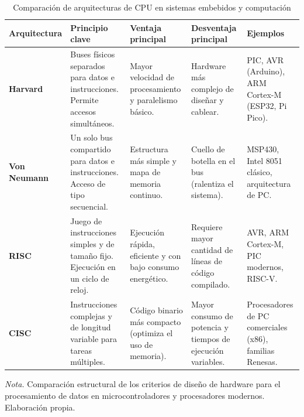 \begin{table}[htbp]
	\centering
	\captionsetup{labelformat=simple, labelsep=newline, textfont=it, labelfont=bf}
	\caption{Comparación de arquitecturas de CPU en sistemas embebidos y computación}
	\label{tab:arqui}
	\vspace{0.3cm}
	
	\begin{tabularx}{\linewidth}{p{2.2cm} X X X p{2.8cm}}
		\toprule %
		\rowcolor[rgb]{0.851, 0.851, 0.851}
		\textbf{Arquitectura} & \textbf{Principio clave} & \textbf{Ventaja principal} & \textbf{Desventaja principal} & \textbf{Ejemplos} \\
		\midrule %
		\textbf{Harvard} & Buses físicos separados para datos e instrucciones. Permite accesos simultáneos. & Mayor velocidad de procesamiento y paralelismo básico. & Hardware más complejo de diseñar y cablear. & PIC, AVR (Arduino), ARM Cortex-M (ESP32, Pi Pico). \\
		\addlinespace
		\textbf{Von Neumann} & Un solo bus compartido para datos e instrucciones. Acceso de tipo secuencial. & Estructura más simple y mapa de memoria continuo. & Cuello de botella en el bus (ralentiza el sistema). & MSP430, Intel 8051 clásico, arquitectura de PC. \\
		\addlinespace
		\textbf{RISC} & Juego de instrucciones simples y de tamaño fijo. Ejecución en un ciclo de reloj. & Ejecución rápida, eficiente y con bajo consumo energético. & Requiere mayor cantidad de líneas de código compilado. & AVR, ARM Cortex-M, PIC modernos, RISC-V. \\
		\addlinespace
		\textbf{CISC} & Instrucciones complejas y de longitud variable para tareas múltiples. & Código binario más compacto (optimiza el uso de memoria). & Mayor consumo de potencia y tiempos de ejecución variables. & Procesadores de PC comerciales (x86), familias Renesas. \\
		\bottomrule %
	\end{tabularx}
	\vspace{0.2cm}
	
	\begin{flushleft}
		\footnotesize \textit{Nota.} Comparación estructural de los criterios de diseño de hardware para el procesamiento de datos en microcontroladores y procesadores modernos. Elaboración propia.
	\end{flushleft}
\end{table}


